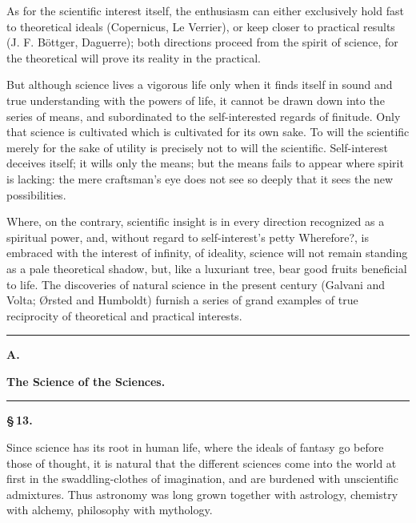 \documentclass[12pt]{book}
\begin{document}
As for the scientific interest itself, the enthusiasm can either exclusively hold fast to
theoretical ideals (Copernicus, Le Verrier), or keep closer to practical results (J. F.
Böttger, Daguerre); both directions proceed from the spirit of science, for the
theoretical will prove its reality in the practical.

But although science lives a vigorous life only when it finds itself in sound and true
understanding with the powers of life, it cannot be drawn down into the series of means,
and subordinated to the self-interested regards of finitude. Only that science is
cultivated which is cultivated for its own sake. To will the scientific merely for the
sake of utility is precisely not to will the scientific. Self-interest deceives itself;
it wills only the means; but the means fails to appear where spirit is lacking: the mere
craftsman's eye does not see so deeply that it sees the new possibilities.

Where, on the contrary, scientific insight is in every direction recognized as a
spiritual power, and, without regard to self-interest's petty Wherefore?, is embraced
with the interest of infinity, of ideality, science will not remain standing as a pale
theoretical shadow, but, like a luxuriant tree, bear good fruits beneficial to life. The
discoveries of natural science in the present century (Galvani and Volta; Ørsted and
Humboldt) furnish a series of grand examples of true reciprocity of theoretical and
practical interests.

\begin{center}\rule{0.35\linewidth}{0.4pt}\end{center}

\begin{center}
  {\large\bfseries A.}\par\vspace{2pt}
  {\bfseries The Science of the Sciences.}\par\vspace{4pt}
  \rule{2cm}{0.4pt}
\end{center}
{}

\begin{center}{\bfseries \S\,13.}\end{center}

Since science has its root in human life, where the ideals of fantasy go before those
of thought, it is natural that the different sciences come into the world at first in
the swaddling-clothes of imagination, and are burdened with unscientific admixtures.
Thus astronomy was long grown together with astrology, chemistry with alchemy,
philosophy with mythology.
\end{document}
